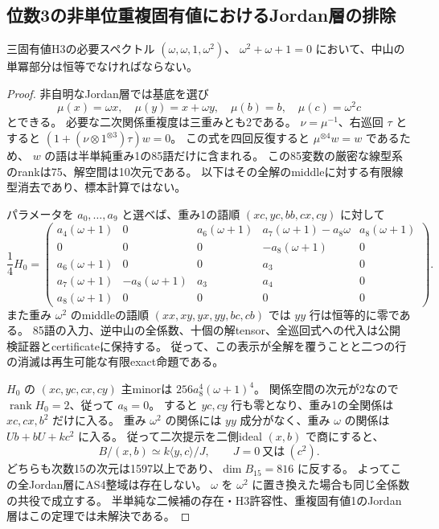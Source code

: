 \subsection{位数3の非単位重複固有値におけるJordan層の排除}
\label{subsec:cubic-third-root-nonunit-Jordan}
\begin{theorem}[非単位重複三乗根の中山は半単純]
\label{thm:cubic-third-root-nonunit-Jordan-empty}
三固有値H3の必要スペクトル $(\omega,\omega,1,\omega^2)$、
$\omega^2+\omega+1=0$ において、中山の単冪部分は恒等でなければならない。
\end{theorem}
\begin{proof}
非自明なJordan層では基底を選び
\[
 \mu(x)=\omega x,\quad \mu(y)=x+\omega y,\quad
 \mu(b)=b,\quad \mu(c)=\omega^2c
\]
とできる。
必要な二次関係重複度は三重みとも2である。
$\nu=\mu^{-1}$、右巡回 $\tau$ とすると
$(1+(\nu\otimes1^{\otimes3})\tau)w=0$。
この式を四回反復すると $\mu^{\otimes4}w=w$ であるため、
$w$ の語は半単純重み1の85語だけに含まれる。
この85変数の厳密な線型系のrankは75、解空間は10次元である。
以下はその全解のmiddleに対する有限線型消去であり、標本計算ではない。

パラメータを $a_0,\ldots,a_9$ と選べば、重み1の語順 $(xc,yc,bb,cx,cy)$ に対して
\[
 \frac14 H_0=\begin{pmatrix}
 a_4(\omega+1)&0&a_6(\omega+1)&a_7(\omega+1)-a_8\omega&a_8(\omega+1)\\
 0&0&0&-a_8(\omega+1)&0\\
 a_6(\omega+1)&0&0&a_3&0\\
 a_7(\omega+1)&-a_8(\omega+1)&a_3&a_4&0\\
 a_8(\omega+1)&0&0&0&0
 \end{pmatrix}.
\]
また重み $\omega^2$ のmiddleの語順 $(xx,xy,yx,yy,bc,cb)$ では $yy$ 行は恒等的に零である。
85語の入力、逆中山の全係数、十個の解tensor、全巡回式への代入は公開検証器とcertificateに保持する。
従って、この表示が全解を覆うことと二つの行の消滅は再生可能な有限exact命題である。

$H_0$ の $(xc,yc,cx,cy)$ 主minorは
$256a_8^4(\omega+1)^4$。
関係空間の次元が2なので $\operatorname{rank}H_0=2$、従って $a_8=0$。
すると $yc,cy$ 行も零となり、重み1の全関係は $xc,cx,b^2$ だけに入る。
重み $\omega^2$ の関係には $yy$ 成分がなく、重み $\omega$ の関係は
$Ub+bU+kc^2$ に入る。
従って二次提示を二側ideal $(x,b)$ で商にすると、
\[
 B/(x,b)\simeq k\langle y,c\rangle/J,\qquad J=0\ \text{又は}\ (c^2).
\]
どちらも次数15の次元は1597以上であり、$\dim B_{15}=816$ に反する。
よってこの全Jordan層にAS4整域は存在しない。
$\omega$ を $\omega^2$ に置き換えた場合も同じ全係数の共役で成立する。
半単純な二候補の存在・H3許容性、重複固有値1のJordan層はこの定理では未解決である。
\end{proof}
